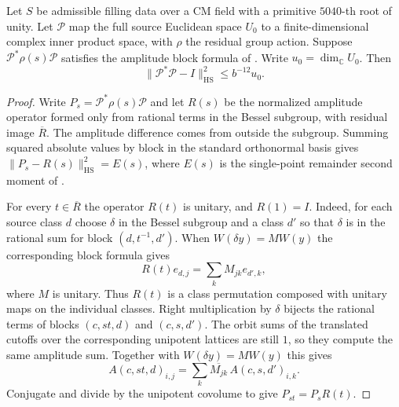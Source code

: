 \begin{lemma}
\label{lem:b-unit-moment}
\emitthmsource
Let $S$ be admissible filling data over a CM field with a primitive $5040$-th root of unity.
Let $\mathcal P$ map the full source Euclidean space $U_0$ to a finite-dimensional complex inner product space, with $\rho$ the
residual group action. Suppose $\mathcal P^*\rho(s)\mathcal P$
satisfies the amplitude block formula of .
Write $u_0=\dim_{\mathbb C}U_0$. Then
\[
 \|\mathcal P^*\mathcal P-I\|_{\mathrm{HS}}^2\le b^{-12}u_0 .
\]
\end{lemma}
\begin{proof}
Write $P_s=\mathcal P^*\rho(s)\mathcal P$ and let $R(s)$ be the normalized amplitude operator formed only from
rational terms in the Bessel subgroup, with residual image $\overline R$.
The amplitude difference comes from outside the subgroup. Summing squared absolute values by block in the standard orthonormal basis gives
$\|P_s-R(s)\|_{\mathrm{HS}}^2=E(s)$,
where $E(s)$ is the single-point remainder second moment of .

For every $t\in\overline R$ the operator $R(t)$ is unitary, and $R(1)=I$.
Indeed, for each source class $d$ choose $\delta$ in the Bessel subgroup
and a class $d'$ so that $\delta$ is in the rational sum for block $(d,t^{-1},d')$.
When $W(\delta y)=MW(y)$ the corresponding block formula gives
\[
 R(t)e_{d,j}=\sum_k M_{jk}e_{d',k},
\]
where $M$ is unitary. Thus $R(t)$ is a class permutation composed with unitary maps on the individual classes.
Right multiplication by $\delta$ bijects the rational terms of blocks $(c,st,d)$ and $(c,s,d')$.
The orbit sums of the translated cutoffs over the corresponding unipotent lattices are still $1$,
so they compute the same amplitude sum. Together with $W(\delta y)=MW(y)$ this gives
\[
 A(c,st,d)_{i,j}
   =\sum_k \overline{M_{jk}}\, A(c,s,d')_{i,k}.
\]
Conjugate and divide by the unipotent covolume to give $P_{st}=P_s R(t)$.


\end{proof}
